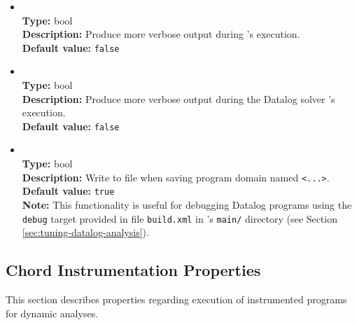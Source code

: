 \begin{itemize}
\item
{} \\
{\bf Type:} bool \\
{\bf Description:} Produce more verbose output during \Chord's execution. \\
{\bf Default value:} {\tt false} 

\item
{} \\
{\bf Type:} bool \\
{\bf Description:} Produce more verbose output during the Datalog solver \bddbddb's execution. \\
{\bf Default value:} {\tt false} 

\item
{} \\
{\bf Type:} bool \\
{\bf Description:} Write to file  when saving program domain named {\tt <...>}. \\
{\bf Default value:} {\tt true}  \\
{\bf Note:} This functionality is useful for debugging Datalog programs using the {\tt debug} target provided in file {\tt build.xml} in \Chord's {\tt main/} directory (see Section \ref{sec:tuning-datalog-analysis}).
\end{itemize}

\subsection{Chord Instrumentation Properties}
\label{sec:instr-props}

This section describes properties regarding execution of instrumented programs for dynamic analyses.


